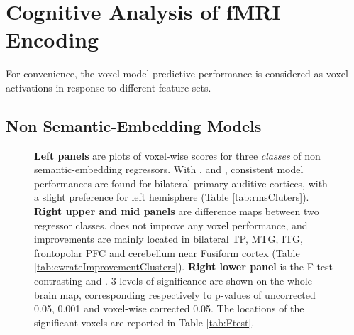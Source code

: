 \section{Cognitive Analysis of fMRI Encoding}

For convenience, the voxel-model predictive performance is considered as voxel activations in response to different feature sets. 

\subsection{Non Semantic-Embedding Models}

\begin{figure}
    \centering
    \caption[Encoding with  Features, Group]{\textbf{Left panels} are plots of voxel-wise  scores for three \emph{classes} of non semantic-embedding regressors. With ,  and , consistent model performances are found for bilateral primary auditive cortices, with a slight preference for left hemisphere (Table \ref{tab:rmsCluters}). \textbf{Right upper and mid panels} are  difference maps between two regressor classes.  does not improve any voxel performance, and  improvements are mainly located in bilateral TP, MTG, ITG, frontopolar PFC and cerebellum near Fusiform cortex (Table \ref{tab:cwrateImprovementClusters}). \textbf{Right lower panel} is the F-test contrasting  and . 3 levels of significance  are shown on the whole-brain map, corresponding respectively to p-values of uncorrected 0.05, 0.001 and voxel-wise corrected 0.05. The locations of the significant voxels are reported in Table \ref{tab:Ftest}.} 
    \label{fig:BASE_ContrastMapG}
\end{figure}

